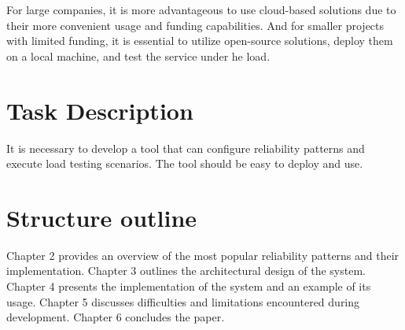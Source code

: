For large companies, it is more advantageous to use cloud-based solutions due to their more convenient usage and funding capabilities. And for smaller projects with limited funding, it is essential to utilize open-source solutions, deploy them on a local machine, and test the service under he load.

\section{Task Description}\label{sec:task-description}
It is necessary to develop a tool that can configure reliability patterns and execute load testing scenarios. The tool should be easy to deploy and use.

\section{Structure outline}\label{sec:structure-outline}
Chapter 2 provides an overview of the most popular reliability patterns and their implementation. Chapter 3 outlines the architectural design of the system. Chapter 4 presents the implementation of the system and an example of its usage. Chapter 5 discusses difficulties and limitations encountered during development. Chapter 6 concludes the paper.
